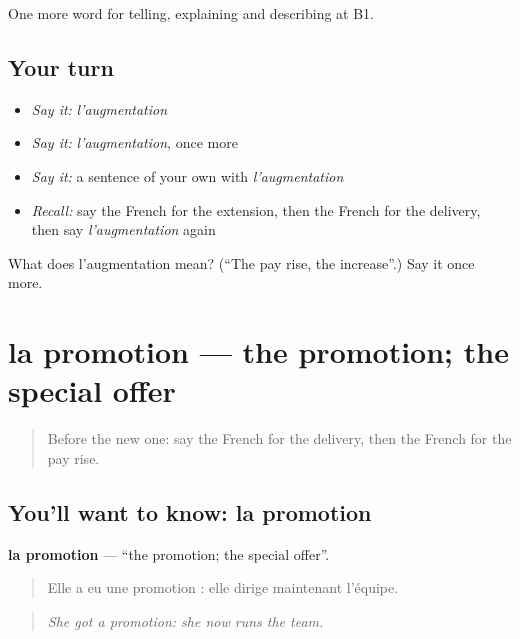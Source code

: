 \begin{grammarlens}[title={What you've built}]
One more word for telling, explaining and describing at B1.
\end{grammarlens}

\subsection*{Your turn}
\begin{itemize}
\raggedright
  \item \emph{Say it:} \emph{l'augmentation}
  \item \emph{Say it:} \emph{l'augmentation}, once more
  \item \emph{Say it:} a sentence of your own with \emph{l'augmentation}
  \item \emph{Recall:} say the French for the extension, then the French for the delivery, then say \emph{l'augmentation} again
\end{itemize}

\begin{tcolorbox}[breakable,colback=teal!4,colframe=teal!35!black,title={Before you move on}]
What does l'augmentation mean? (\textquotedblleft{}The pay rise, the increase\textquotedblright{}.) Say it once more.
\end{tcolorbox}
\section[la promotion]{la promotion — the promotion; the special offer}

\label{lesson:FR-C360-promotion}



\begin{quote}
Before the new one: say the French for the delivery, then the French for the pay rise.
\end{quote}

\subsection*{You'll want to know: la promotion}
\textbf{la promotion} — \textquotedblleft{}the promotion; the special offer\textquotedblright{}.

\begin{quote}
Elle a eu une promotion : elle dirige maintenant l'équipe.
\end{quote}

\begin{quote}
\emph{She got a promotion: she now runs the team.}
\end{quote}

